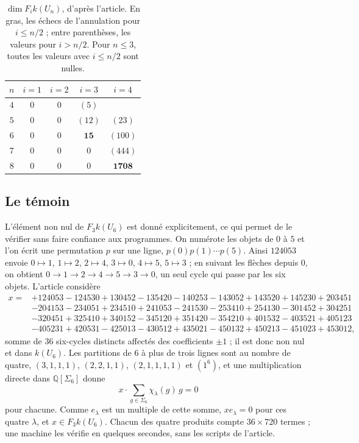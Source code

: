 \documentclass[11pt,a4paper]{amsart}
\theoremstyle{definition}
\theoremstyle{plain}
\theoremstyle{remark}
\newcommand{\Q}{\mathbb Q}
\begin{document}
\begin{table}[h]
\centering
\begin{tabular}{c|cccc}
\toprule
$n$ & $i=1$ & $i=2$ & $i=3$ & $i=4$ \\
\midrule
$4$ & $0$ & $0$ & $(5)$ & \\
$5$ & $0$ & $0$ & $(12)$ & $(23)$ \\
$6$ & $0$ & $0$ & $\mathbf{15}$ & $(100)$ \\
$7$ & $0$ & $0$ & $0$ & $(444)$ \\
$8$ & $0$ & $0$ & $0$ & $\mathbf{1708}$ \\
\bottomrule
\end{tabular}
\medskip
\caption{$\dim F_i k(U_n)$, d'après l'article. En gras, les échecs de l'annulation pour $i \le n/2$ ; entre parenthèses, les valeurs pour $i > n/2$. Pour $n \le 3$, toutes les valeurs avec $i \le n/2$ sont nulles.}\label{tab:dims}
\end{table}

\subsection{Le témoin}

L'élément non nul de $F_3 k(U_6)$ est donné explicitement, ce qui permet de le vérifier sans faire confiance aux programmes. On numérote les objets de $0$ à $5$ et l'on écrit une permutation $p$ sur une ligne, $p(0)p(1)\cdots p(5)$. Ainsi $124053$ envoie $0 \mapsto 1$, $1 \mapsto 2$, $2 \mapsto 4$, $3 \mapsto 0$, $4 \mapsto 5$, $5 \mapsto 3$ ; en suivant les flèches depuis $0$, on obtient $0 \to 1 \to 2 \to 4 \to 5 \to 3 \to 0$, un seul cycle qui passe par les six objets. L'article considère
\[
\begin{aligned}
x = {}&{+}124053 - 124530 + 130452 - 135420 - 140253 - 143052 + 143520 + 145230 + 203451\\
&{-}204153 - 234051 + 234510 + 241053 - 241530 - 253410 + 254130 - 301452 + 304251\\
&{-}320451 + 325410 + 340152 - 345120 + 351420 - 354210 + 401532 - 403521 + 405123\\
&{-}405231 + 420531 - 425013 - 430512 + 435021 - 450132 + 450213 - 451023 + 453012,
\end{aligned}
\]
somme de $36$ six-cycles distincts affectés des coefficients $\pm 1$ ; il est donc non nul et dans $k(U_6)$. Les partitions de $6$ à plus de trois lignes sont au nombre de quatre, $(3,1,1,1)$, $(2,2,1,1)$, $(2,1,1,1,1)$ et $(1^6)$, et une multiplication directe dans $\Q[\Sigma_6]$ donne
\[
x \cdot \sum_{g \in \Sigma_6} \chi_\lambda(g)\, g = 0
\]
pour chacune. Comme $e_\lambda$ est un multiple de cette somme, $x e_\lambda = 0$ pour ces quatre $\lambda$, et $x \in F_3 k(U_6)$. Chacun des quatre produits compte $36 \times 720$ termes ; une machine les vérifie en quelques secondes, sans les scripts de l'article.
\end{document}

